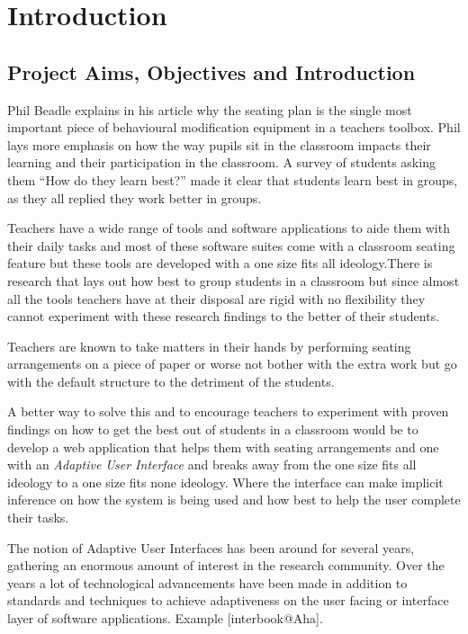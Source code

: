 \section{Introduction}
\subsection{Project Aims, Objectives and Introduction} 
Phil Beadle \cite{website:TES} explains in his article why the seating plan is the single most important piece of behavioural modification equipment in a teachers toolbox. Phil lays more emphasis on how the way pupils sit in the classroom impacts their learning and their participation in the classroom. A survey of students asking them ``How do they learn best?'' made it clear that students learn best in groups, as they all replied they work better in groups.

Teachers have a wide range of tools and software applications to aide them with their daily tasks and most of these software suites come with a classroom seating feature but these tools are developed with a one size fits all ideology.There is research that lays out how best to group students in a classroom but since almost all the tools teachers have at their disposal are rigid with no flexibility they cannot experiment with these research findings to the better of their students.

Teachers are known to take matters in their hands by performing seating arrangements on a piece of paper or worse not bother with the extra work but go with the default structure to the detriment of the students.

A better way to solve this and to encourage teachers to experiment with proven findings on how to get the best out of students in a classroom would be to develop a web application that helps them with seating arrangements and one with an \emph{Adaptive User Interface} and breaks away from the one size fits all ideology to a one size fits none ideology. Where the interface can make implicit inference on how the system is being used and how best to help the user complete their tasks.

The notion of Adaptive User Interfaces has been around for several years, gathering an enormous amount of interest in the research community. Over the years a lot of technological advancements have been made in addition to standards and techniques to achieve adaptiveness on the user facing or interface layer of software applications. Example [interbook@Aha]. \cite{brusilovsky2007user} 

